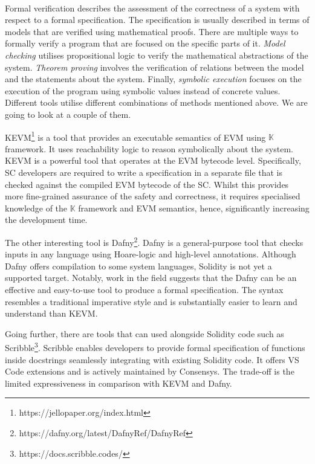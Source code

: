 \documentclass[oneside]{ecsproject}     %
\begin{document}
\paragraph*{}
Formal verification describes the assessment of the correctness of a system with respect
to a formal specification\cite{eth_formal_verification}. The specification is usually described
in terms of models that are verified using mathematical proofs. There are multiple ways to formally verify a program
that are focused on the specific parts of it. \textit{Model checking} utilises propositional logic 
to verify the mathematical abstractions of the system. \textit{Theorem proving} involves the verification of
relations between the model and the statements about the system. Finally, \textit{symbolic execution} focuses
on the execution of the program using symbolic values instead of concrete values\cite{eth_formal_verification}.
Different tools utilise different combinations of methods mentioned above. We are going to look at a couple of them.

KEVM\footnote{https://jellopaper.org/index.html} is a tool that provides an executable semantics of EVM using $\mathbb{K}$ framework. 
It uses reachability logic to reason symbolically about the system\cite{kevm}. KEVM is a powerful tool that operates at the EVM bytecode level.
Specifically, SC developers are required to write a specification in a separate file that is checked against the compiled EVM bytecode of the SC.
Whilst this provides more fine-grained assurance of the safety and correctness, it requires specialised knowledge of the $\mathbb{K}$ framework and EVM
semantics, hence, significantly increasing the development time.

The other interesting tool is Dafny\footnote{https://dafny.org/latest/DafnyRef/DafnyRef}. Dafny is a general-purpose tool that checks inputs in any language 
using Hoare-logic and high-level annotations. Although Dafny offers compilation to some system languages, Solidity is not yet a supported target. 
Notably, work in the field suggests that the Dafny can be an effective and easy-to-use tool to produce a formal specification\cite{dafny_deductive}.
The syntax resembles a traditional imperative style and is substantially easier to learn and understand than KEVM.

Going further, there are tools that can used alongside Solidity code such as Scribble\footnote{https://docs.scribble.codes/}. 
Scribble enables developers to provide formal specification of functions inside docstrings seamlessly integrating with existing 
Solidity code. It offers VS Code extensions and is actively maintained by Consensys. 
The trade-off is the limited expressiveness in comparison with KEVM and Dafny.
\end{document}
